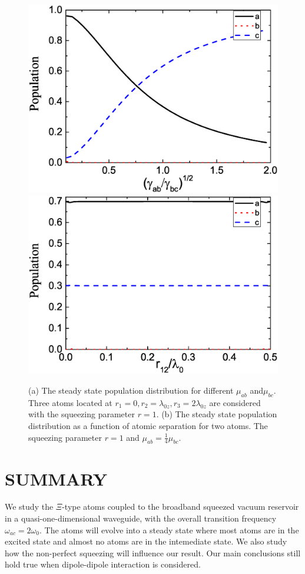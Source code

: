 \documentclass[aps,showpacs,twocolumn,twoside,groupedaddress]{revtex4}
\begin{document}
\begin{figure}
\includegraphics[width=1\columnwidth]{fig3a.eps}
\includegraphics[width=1\columnwidth]{fig3b.eps}
\caption{(a) The steady state population distribution for different $\mu_{ab}$ and$\mu_{bc}$. Three atoms located at $r_1=0, r_2=\lambda_{0z}, r_3=2\lambda_{0z}$ are considered with the squeezing parameter $r=1$. (b) The steady state population distribution as a function of atomic separation for two atoms. The squeezing parameter $r=1$ and $\mu_{ab}=\frac{1}{4}\mu_{bc}$.}
\label{2}
\end{figure}

\section{SUMMARY}
We study the $\Xi$-type atoms coupled to the broadband squeezed vacuum reservoir in a quasi-one-dimensional waveguide, with the overall transition frequency $\omega_{ac}=2\omega_0$. The atoms will evolve into a steady state where most atoms are in the excited state and almost no atoms are in the intemediate state. We also study how the non-perfect squeezing will influence our result. Our main conclusions still hold true when dipole-dipole interaction is considered.
\end{document}
